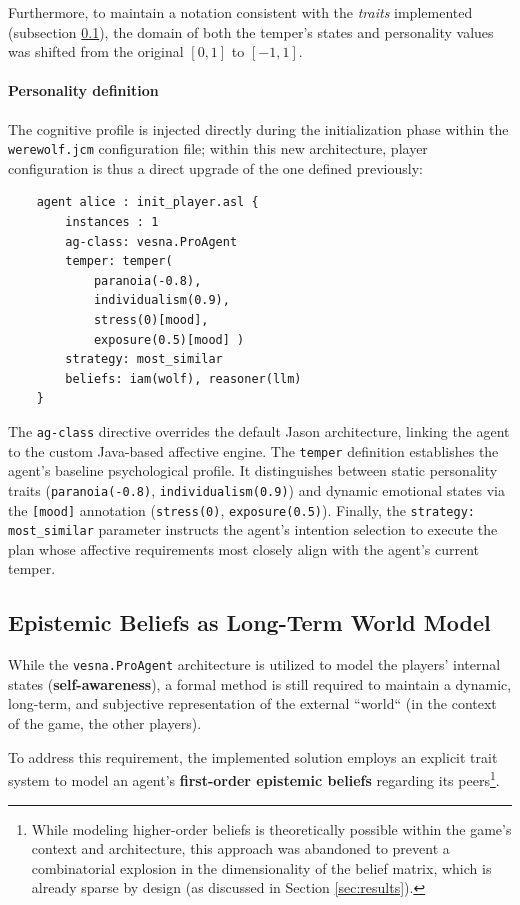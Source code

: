 Furthermore, to maintain a notation consistent with the \emph{traits} implemented (subsection \ref{subsec:first_order_beliefs}), the domain of both the temper's states and personality values was shifted from the original $[0, 1]$ to $[-1, 1]$.

\paragraph{Personality definition} The cognitive profile is injected directly during the initialization phase within the \texttt{werewolf.jcm} configuration file; within this new architecture, player configuration is thus a direct upgrade of the one defined previously:

\begin{verbatim}
    agent alice : init_player.asl {
        instances : 1
        ag-class: vesna.ProAgent
        temper: temper( 
            paranoia(-0.8), 
            individualism(0.9), 
            stress(0)[mood], 
            exposure(0.5)[mood] )
        strategy: most_similar
        beliefs: iam(wolf), reasoner(llm)
    }
\end{verbatim}

The \texttt{ag-class} directive overrides the default Jason architecture, linking the agent to the custom Java-based affective engine. The \texttt{temper} definition establishes the agent's baseline psychological profile. It distinguishes between static personality traits (\texttt{paranoia(-0.8)}, \texttt{individualism(0.9)}) and dynamic emotional states via the \texttt{[mood]} annotation (\texttt{stress(0)}, \texttt{exposure(0.5)}). 
Finally, the \texttt{strategy: most\_similar} parameter instructs the agent's intention selection to execute the plan whose affective requirements most closely align with the agent's current temper.




\subsection{Epistemic Beliefs as Long-Term World Model}
\label{subsec:first_order_beliefs}

While the \texttt{vesna.ProAgent} architecture is utilized to model the players' internal states (\textbf{self-awareness}), a formal method is still required to maintain a dynamic, long-term, and subjective representation of the external ``world`` (in the context of the game, the other players).

To address this requirement, the implemented solution employs an explicit trait system to model an agent’s \textbf{first-order epistemic beliefs} regarding its peers\footnote{While modeling higher-order beliefs is theoretically possible within the game's context and architecture, this approach was abandoned to prevent a combinatorial explosion in the dimensionality of the belief matrix, which is already sparse by design (as discussed in Section \ref{sec:results}).}.



